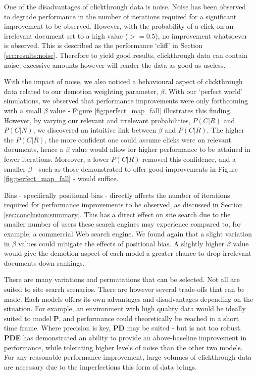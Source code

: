 One of the disadvantages of clickthrough data is noise. Noise has been observed to degrade performance in the number of iterations required for a significant improvement to be observed. However, with the probability of a click on an irrelevant document set to a high value ($>=0.5$), no improvement whatsoever is observed. This is described as the performance `cliff' in Section \ref{sec:results:noise}. Therefore to yield good results, clickthrough data can contain noise; excessive amounts however will render the data as good as useless.

With the impact of noise, we also noticed a behavioural aspect of clickthrough data related to our demotion weighting parameter, $\beta$. With our `perfect world' simulations, we observed that performance improvements were only forthcoming with a small $\beta$ value - Figure \ref{fig:perfect_map_fall} illustrates this finding. However, by varying our relevant and irrelevant probabilities, $P(C|R)$ and $P(C|N)$, we discovered an intuitive link between $\beta$ and $P(C|R)$. The higher the $P(C|R)$, the more confident one could assume clicks were on relevant documents, hence a $\beta$ value would allow for higher performance to be attained in fewer iterations. Moreover, a lower $P(C|R)$ removed this confidence, and a smaller $\beta$ - such as those demonstrated to offer good improvements in Figure \ref{fig:perfect_map_fall} - would suffice. 

Bias - specifically positional bias - directly affects the number of iterations required for performance improvements to be observed, as discussed in Section \ref{sec:conclusion:summary}. This has a direct effect on site search due to the smaller number of users these search engines may experience compared to, for example, a commercial Web search engine. We found again that a slight variation in $\beta$ values could mitigate the effects of positional bias. A slightly higher $\beta$ value would give the demotion aspect of each model a greater chance to drop irrelevant documents down rankings.

There are many variations and permutations that can be selected. Not all are suited to site search scenarios. There are however several trade-offs that can be made. Each models offers its own advantages and disadvantages depending on the situation. For example, an environment with high quality data would be ideally suited to model \textbf{P}, and performance could theoretically be reached in a short time frame. Where precision is key, \textbf{PD} may be suited - but is not too robust. \textbf{PDE} has demonstrated an ability to provide an above-baseline improvement in performance, while tolerating higher levels of noise than the other two models. For any reasonable performance improvement, large volumes of clickthrough data are necessary due to the imperfections this form of data brings.

